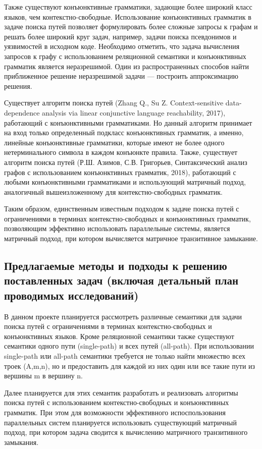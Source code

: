 \documentclass[12pt]{article}  %
\theoremstyle{remark}
\begin{document}
Также существуют конъюнктивные грамматики, задающие более широкий класс языков, чем контекстно-свободные. Использование конъюнктивных грамматик в задаче поиска путей позволяет формулировать более сложные запросы к графам и решать более широкий круг задач, например, задачи поиска псевдонимов и уязвимостей в исходном коде. Необходимо отметить, что задача вычисления запросов к графу с использованием реляционной семантики и конъюнктивных грамматик является неразрешимой. Один из распространенных способов найти приближенное решение неразрешимой задачи — построить аппроксимацию решения.

Существует алгоритм поиска путей (Zhang Q., Su Z. Context-sensitive data-dependence analysis via linear conjunctive language reachability, 2017), работающий с конъюнктивными грамматиками. Но данный алгоритм принимает на вход только определенный подкласс конъюнктивных грамматик, а именно, линейные конъюнктивные грамматики, которые имеют не более одного нетерминального символа в каждом конъюнкте правила. Также, существует алгоритм поиска путей (Р.Ш. Азимов, С.В. Григорьев, Синтаксический анализ графов с использованием конъюнктивных грамматик, 2018), работающий с любыми конъюнктивными грамматиками и использующий матричный подход, аналогичный вышеизложенному для контекстно-свободных грамматик.

Таким образом, единственным известным подходом к задаче поиска путей с ограничениями в терминах контекстно-свободных и конъюнктивных грамматик, позволяющим эффективно использовать параллельные системы, является матричный подход, при котором вычисляется матричное транзитивное замыкание.

\subsection{Предлагаемые методы и подходы к решению поставленных задач (включая детальный план проводимых исследований)}
В данном проекте планируется рассмотреть различные семантики для задачи поиска путей с ограничениями в терминах контекстно-свободных и конъюнктивных языков. Кроме реляционной семантики также существуют семантики одного пути (single-path) и всех путей (all-path). При использовании single-path или all-path семантики требуется не только найти множество всех троек (A,m,n), но и предоставить для каждой из них один или все такие пути из вершины m в вершину n.

Далее планируется для этих семантик разработать и реализовать алгоритмы поиска путей с использованием контекстно-свободных и конъюнктивных грамматик. При этом для возможности эффективного испоспользования параллельных систем планируется использовать существующий матричный подход, при котором задача сводится к вычислению матричного транзитивного замыкания.
\end{document}
